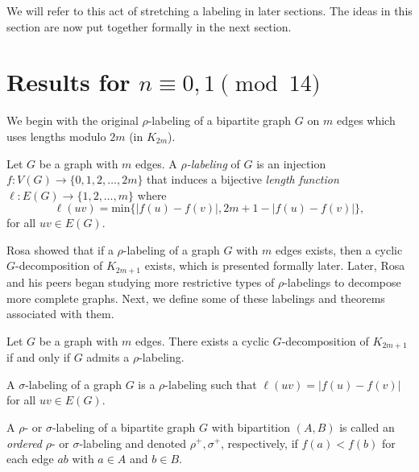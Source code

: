   We will refer to this act of stretching a labeling in later sections. The ideas in this section are now put together formally in the next section.
  
  
\section{Results for $n\equiv 0,1 \pmod{14}$}\label{sec:0,1results}

We begin with the original $\rho$-labeling of a bipartite graph $G$ on $m$ edges which uses lengths modulo $2m$ (in $K_{2m}$). 

\begin{definition} \label{def:rho} 
 Let $G$ be a graph with $m$ edges.  A \textit{$\rho$-labeling} of $G$ is an injection $f: V(G) \rightarrow \{0,1,2, \dots, 2m\}$ that induces a bijective \textit{length function $\ell: E(G) \rightarrow \{1,2, \dots, m\}$} where 
    $$
    \ell(uv) = \text{min}\{|f(u)-f(v)|,2m+1-|f(u)-f(v)|\},
    $$
for all  $uv \in E(G)$.
\end{definition}

Rosa showed that if a $\rho$-labeling of a graph $G$ with $m$ edges exists, then a cyclic $G$-decomposition of $K_{2m+1}$ exists, which is presented formally later. Later, Rosa and his peers began studying more restrictive types of $\rho$-labelings to decompose more complete graphs. Next, we define some of these labelings and theorems associated with them.

\begin{thm}\label{thm:Rhosa}  
Let $G$ be a graph with $m$ edges.  There exists a cyclic $G$-decomposition of $K_{2m+1}$ if and only if $G$ admits a $\rho$-labeling.
\end{thm}

\begin{definition} \label{def:sigma} 
A $\sigma$-labeling of a graph $G$ is a $\rho$-labeling such that $\ell(uv) = |f(u) - f(v)|$ for all $uv \in E(G).$
\end{definition}

\begin{definition} \label{def:rho and sigma ordered def} 
A $\rho$- or $\sigma$-labeling of a bipartite graph $G$ with bipartition $(A,B)$ is called an \emph{ordered} $\rho$- or $\sigma$-labeling and denoted $\rho^+,\sigma^+$, respectively, if $f(a) < f(b)$ for each edge $ab$ with $a \in A$ and $b \in B$.
\end{definition}


